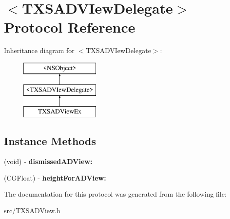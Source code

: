 \hypertarget{protocol_t_x_s_a_d_v_iew_delegate-p}{}\section{$<$T\+X\+S\+A\+D\+V\+Iew\+Delegate$>$ Protocol Reference}
\label{protocol_t_x_s_a_d_v_iew_delegate-p}
Inheritance diagram for $<$T\+X\+S\+A\+D\+V\+Iew\+Delegate$>$\+:\begin{figure}[H]
\begin{center}
\leavevmode
\includegraphics[height=3.000000cm]{protocol_t_x_s_a_d_v_iew_delegate-p}
\end{center}
\end{figure}
\subsection*{Instance Methods}
\begin{DoxyCompactItemize}
\item 
\hypertarget{protocol_t_x_s_a_d_v_iew_delegate-p_ac8b3c3518b50492f33bf7ca8c3748ef3}{}(void) -\/ {\bfseries dismissed\+A\+D\+View\+:}\label{protocol_t_x_s_a_d_v_iew_delegate-p_ac8b3c3518b50492f33bf7ca8c3748ef3}

\item 
\hypertarget{protocol_t_x_s_a_d_v_iew_delegate-p_a37874b9d4ffebaac30de460003a2c22d}{}(C\+G\+Float) -\/ {\bfseries height\+For\+A\+D\+View\+:}\label{protocol_t_x_s_a_d_v_iew_delegate-p_a37874b9d4ffebaac30de460003a2c22d}

\end{DoxyCompactItemize}


The documentation for this protocol was generated from the following file\+:\begin{DoxyCompactItemize}
\item 
src/T\+X\+S\+A\+D\+View.\+h\end{DoxyCompactItemize}
